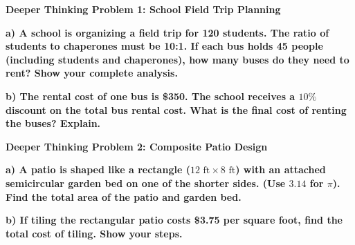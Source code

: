 \documentclass[12pt, letterpaper, fleqn]{article}
\begin{document}
\vspace{4mm}

\begin{tcolorbox}[colback=black!5, colframe=black!50, boxrule=1pt, arc=4mm, left=6mm, right=6mm, top=5mm, bottom=5mm]
\textbf{Deeper Thinking Problem 1: School Field Trip Planning}

\medskip

\noindent
\textbf{a) A school is organizing a field trip for 120 students. The ratio of students to chaperones must be 10:1. If each bus holds 45 people (including students and chaperones), how many buses do they need to rent? Show your complete analysis.}

\vspace{2.5cm}

\noindent
\textbf{b) The rental cost of one bus is \$350. The school receives a $10\%$ discount on the total bus rental cost. What is the final cost of renting the buses? Explain.}

\vspace{2cm}
\end{tcolorbox}
\newpage

\begin{tcolorbox}[colback=black!5, colframe=black!50, boxrule=1pt, arc=4mm, left=6mm, right=6mm, top=5mm, bottom=5mm]
\textbf{Deeper Thinking Problem 2: Composite Patio Design}

\medskip

\noindent
\textbf{a) A patio is shaped like a rectangle ($12\text{ ft} \times 8\text{ ft}$) with an attached semicircular garden bed on one of the shorter sides. (Use $3.14$ for $\pi$). Find the total area of the patio and garden bed.}

\vspace{3.5cm}

\noindent
\textbf{b) If tiling the rectangular patio costs \$3.75 per square foot, find the total cost of tiling. Show your steps.}

\vspace{3.5cm}
\end{tcolorbox}
\newpage
\end{document}
